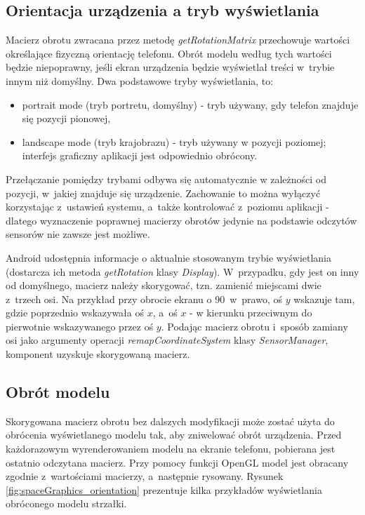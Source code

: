 \documentclass[a4paper,twocolumn,11pt]{article}
\begin{document}
\subsection{Orientacja urządzenia a tryb wyświetlania}
 Macierz obrotu zwracana przez metodę \emph{getRotationMatrix} przechowuje wartości określające fizyczną orientację telefonu.
 Obrót modelu według tych wartości będzie niepoprawny, jeśli ekran urządzenia będzie wyświetlał treści w~trybie innym niż domyślny.
 Dwa podstawowe tryby wyświetlania, to:
 \begin{itemize}
  \item portrait mode (tryb portretu, domyślny) - tryb używany, gdy telefon znajduje się pozycji pionowej,
  \item landscape mode (tryb krajobrazu) - tryb używany w pozycji poziomej; interfejs graficzny aplikacji jest odpowiednio obrócony.
 \end{itemize}
 
 Przełączanie pomiędzy trybami odbywa się automatycznie w zależności od pozycji, w~jakiej znajduje się urządzenie.
 Zachowanie to można wyłączyć korzystając z~ustawień systemu, a~także kontrolować z~poziomu aplikacji - dlatego wyznaczenie poprawnej macierzy obrotów jedynie na podstawie odczytów sensorów nie zawsze jest możliwe.
 
 Android udostępnia informacje o aktualnie stosowanym trybie wyświetlania (dostarcza ich metoda \emph{getRotation} klasy \emph{Display}).
 W~przypadku, gdy jest on inny od domyślnego, macierz należy skorygować, tzn. zamienić miejscami dwie z~trzech osi.
 Na przykład przy obrocie ekranu o 90\textdegree~w~prawo, oś $y$ wskazuje tam, gdzie poprzednio wskazywała oś $x$, a~oś $x$ - w kierunku przeciwnym do pierwotnie wskazywanego przez oś $y$.
 Podając macierz obrotu i~sposób zamiany osi jako argumenty operacji \emph{remapCoordinateSystem} klasy \emph{SensorManager}, komponent uzyskuje skorygowaną macierz.

\subsection{Obrót modelu}
 Skorygowana macierz obrotu bez dalszych modyfikacji może zostać użyta do obrócenia wyświetlanego modelu tak, aby zniwelować obrót urządzenia.
 Przed każdorazowym wyrenderowaniem modelu na ekranie telefonu, pobierana jest ostatnio odczytana macierz.
 Przy pomocy funkcji OpenGL model jest obracany zgodnie z~wartościami macierzy, a~następnie rysowany.
 Rysunek \ref{fig:spaceGraphics_orientation} prezentuje kilka przykładów wyświetlania obróconego modelu strzałki.
 
\end{document}
